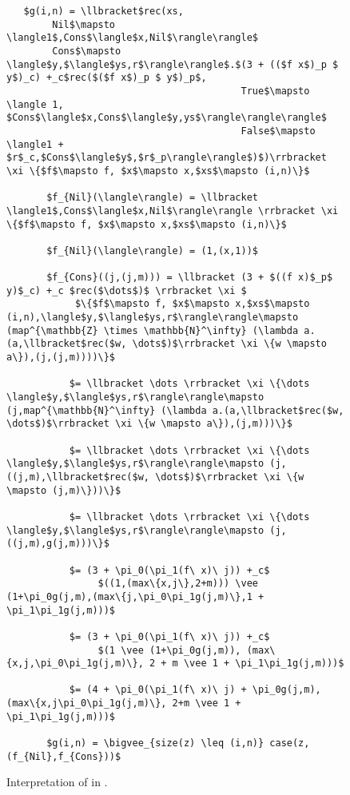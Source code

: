 \begin{figure}[H]
  \caption{Interpretation of  in .}
  \label{fig:interp_sizes_outer_rec}
  \begin{lstlisting}
   $g(i,n) = \llbracket$rec(xs,
        Nil$\mapsto \langle1$,Cons$\langle$x,Nil$\rangle\rangle$
        Cons$\mapsto \langle$y,$\langle$ys,r$\rangle\rangle$.$(3 + (($f x$)_p $ y$)_c) +_c$rec($($f x$)_p $ y$)_p$,
                                         True$\mapsto \langle 1, $Cons$\langle$x,Cons$\langle$y,ys$\rangle\rangle\rangle$
                                         False$\mapsto \langle1 + $r$_c,$Cons$\langle$y$,$r$_p\rangle\rangle$)$)\rrbracket \xi \{$f$\mapsto f, $x$\mapsto x,$xs$\mapsto (i,n)\}$

       $f_{Nil}(\langle\rangle) = \llbracket \langle1$,Cons$\langle$x,Nil$\rangle\rangle \rrbracket \xi \{$f$\mapsto f, $x$\mapsto x,$xs$\mapsto (i,n)\}$

       $f_{Nil}(\langle\rangle) = (1,(x,1))$

       $f_{Cons}((j,(j,m))) = \llbracket (3 + $((f x)$_p$ y)$_c) +_c $rec($\dots$)$ \rrbracket \xi $
            $\{$f$\mapsto f, $x$\mapsto x,$xs$\mapsto (i,n),\langle$y,$\langle$ys,r$\rangle\rangle\mapsto (map^{\mathbb{Z} \times \mathbb{N}^\infty} (\lambda a.(a,\llbracket$rec($w, \dots$)$\rrbracket \xi \{w \mapsto a\}),(j,(j,m))))\}$

           $= \llbracket \dots \rrbracket \xi \{\dots \langle$y,$\langle$ys,r$\rangle\rangle\mapsto (j,map^{\mathbb{N}^\infty} (\lambda a.(a,\llbracket$rec($w, \dots$)$\rrbracket \xi \{w \mapsto a\}),(j,m)))\}$

           $= \llbracket \dots \rrbracket \xi \{\dots \langle$y,$\langle$ys,r$\rangle\rangle\mapsto (j,((j,m),\llbracket$rec($w, \dots$)$\rrbracket \xi \{w \mapsto (j,m)\}))\}$

           $= \llbracket \dots \rrbracket \xi \{\dots \langle$y,$\langle$ys,r$\rangle\rangle\mapsto (j,((j,m),g(j,m)))\}$

           $= (3 + \pi_0(\pi_1(f\ x)\ j)) +_c$
                $((1,(max\{x,j\},2+m))) \vee (1+\pi_0g(j,m),(max\{j,\pi_0\pi_1g(j,m)\},1 + \pi_1\pi_1g(j,m)))$

           $= (3 + \pi_0(\pi_1(f\ x)\ j)) +_c$
                $(1 \vee (1+\pi_0g(j,m)), (max\{x,j,\pi_0\pi_1g(j,m)\}, 2 + m \vee 1 + \pi_1\pi_1g(j,m)))$

           $= (4 + \pi_0(\pi_1(f\ x)\ j) + \pi_0g(j,m), (max\{x,j\pi_0\pi_1g(j,m)\}, 2+m \vee 1 + \pi_1\pi_1g(j,m)))$

       $g(i,n) = \bigvee_{size(z) \leq (i,n)} case(z, (f_{Nil},f_{Cons}))$
  \end{lstlisting}
\end{figure}
